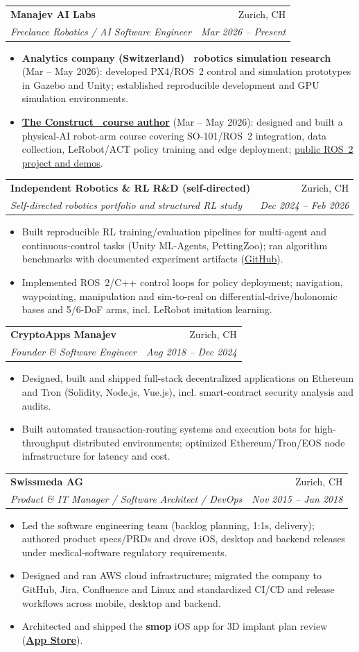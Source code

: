 \documentclass[a4paper,11pt]{article}
\makeatletter
\newcommand{\resumeItem}[1]{
  \item\small{
    {#1 \vspace{-2pt}}
  }
}
\newcommand{\resumeSubheading}[4]{
  \needspace{4\baselineskip}%
  \vspace{-1pt}\item
    \begin{tabular*}{0.97\textwidth}[t]{l@{\extracolsep{\fill}}r}
      \textbf{#1} & #2 \\
      \textit{\small#3} & \textit{\small #4} \\
    \end{tabular*}\vspace{-5pt}
}
\newcommand{\resumeItemListStart}{\begin{itemize}}
\newcommand{\resumeItemListEnd}{\end{itemize}\vspace{-5pt}}
\makeatother
\begin{document}
    \resumeSubheading
      {Manajev AI Labs}{Zurich, CH}
      {Freelance Robotics / AI Software Engineer}{Mar 2026 -- Present}
      \resumeItemListStart
        \resumeItem{\textbf{Analytics company (Switzerland) \textemdash\ robotics simulation research} (Mar -- May 2026): developed PX4/ROS~2 control and simulation prototypes in Gazebo and Unity; established reproducible development and GPU simulation environments.}
        \resumeItem{\textbf{\href{https://app.theconstruct.ai/courses/ai-robot-arm-project-428/}{The Construct \textemdash\ course author}} (Mar -- May 2026): designed and built a physical-AI robot-arm course covering SO-101/ROS~2 integration, data collection, LeRobot/ACT policy training and edge deployment; \href{https://github.com/legalaspro/so101-ros-physical-ai}{public ROS~2 project and demos}.}
      \resumeItemListEnd

    \resumeSubheading
      {Independent Robotics \& RL R\&D \textnormal{(self-directed)}}{Zurich, CH}
      {Self-directed robotics portfolio and structured RL study}{Dec 2024 -- Feb 2026}
      \resumeItemListStart
        \resumeItem{Built reproducible RL training/evaluation pipelines for multi-agent and continuous-control tasks (Unity ML-Agents, PettingZoo); ran algorithm benchmarks with documented experiment artifacts (\href{https://github.com/legalaspro}{GitHub}).}
        \resumeItem{Implemented ROS~2/C++ control loops for policy deployment; navigation, waypointing, manipulation and sim-to-real on differential-drive/holonomic bases and 5/6-DoF arms, incl. LeRobot imitation learning.}
      \resumeItemListEnd

    \resumeSubheading
      {CryptoApps Manajev}{Zurich, CH}
      {Founder \& Software Engineer}{Aug 2018 -- Dec 2024}
      \resumeItemListStart
        \resumeItem{Designed, built and shipped full-stack decentralized applications on Ethereum and Tron (Solidity, Node.js, Vue.js), incl. smart-contract security analysis and audits.}
        \resumeItem{Built automated transaction-routing systems and execution bots for high-throughput distributed environments; optimized Ethereum/Tron/EOS node infrastructure for latency and cost.}
      \resumeItemListEnd

    \resumeSubheading
      {Swissmeda AG}{Zurich, CH}
      {Product \& IT Manager / Software Architect / DevOps}{Nov 2015 -- Jun 2018}
      \resumeItemListStart
        \resumeItem{Led the software engineering team (backlog planning, 1:1s, delivery); authored product specs/PRDs and drove iOS, desktop and backend releases under medical-software regulatory requirements.}
        \resumeItem{Designed and ran AWS cloud infrastructure; migrated the company to GitHub, Jira, Confluence and Linux and standardized CI/CD and release workflows across mobile, desktop and backend.}
        \resumeItem{Architected and shipped the \textbf{smop} iOS app for 3D implant plan review (\href{https://apps.apple.com/us/app/smop/id971741467}{\textbf{App Store}}).}
      \resumeItemListEnd
\end{document}
